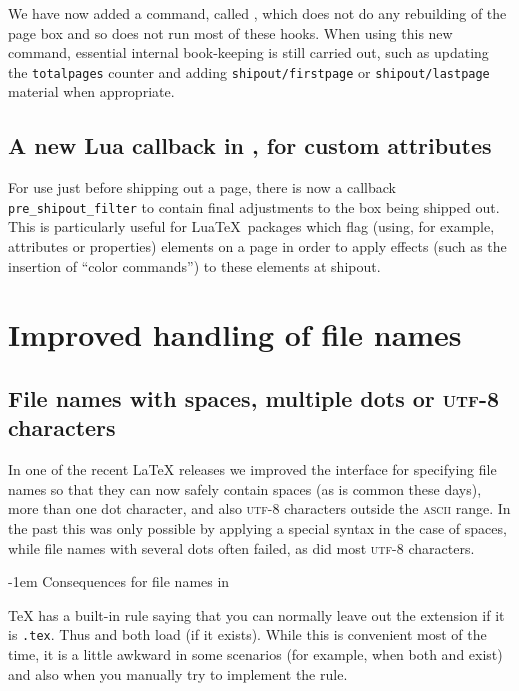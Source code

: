 \documentclass{ltnews}
\makeatletter
\providecommand\LuaTeX{\hologo{LuaTeX}}
\providecommand\acro[1]{\textsc{#1}}
\renewcommand{\subsubsection}{%
   \@startsection      {subsubsection}{2}{0pt}{1.5ex \@plus 1ex \@minus .2ex}%
      {-1em}{\@subheadingfont\colonize}%
}
\providecommand\colonize[1]{#1:}
\makeatother
\begin{document}
 
We have now added a command, called , which does not do
any rebuilding of the page box and so does not run most of these
hooks.  When using this new command, essential internal book-keeping
is still carried out, such as updating the \texttt{totalpages} counter
and adding \texttt{shipout/firstpage} or \texttt{shipout/lastpage}
material when appropriate.


\subsection{A new Lua callback in ,
for custom attributes}

For use just before shipping out a page, there is now a \LuaTeX{}
callback \texttt{pre\_shipout\_filter} to contain final adjustments to
the box being shipped out.  This is particularly useful for
Lua\TeX\ packages which flag (using, for example, attributes or
properties) elements on a page in order to apply effects (such as the
insertion of \enquote{color commands}) to these elements at shipout.



\section{Improved handling of file names}

\subsection[File names with spaces, multiple dots or\\
            \acro{utf-8} characters]
           {File names with spaces, multiple dots or \acro{utf-8} characters}

In one of the recent \LaTeX{} releases we improved the interface
for specifying file names so that they can now safely contain spaces
(as is common these days),
more than one dot character, and also \acro{utf-8} characters
outside the \acro{ascii} range. 
In the past this was only possible by applying a special syntax
in the case of spaces, 
while file names with several dots often failed, 
as did most \acro{utf-8} characters.


\subsubsection{Consequences for file names in }

\TeX{} has a built-in rule saying that you can normally leave out the
extension if it is \texttt{.tex}.  Thus \verb== and
\verb== both load  (if it exists).
While this is convenient most of the time, it is a little awkward in
some scenarios (for example, when both  and 
exist) and also when you manually try to implement the rule.
\end{document}
